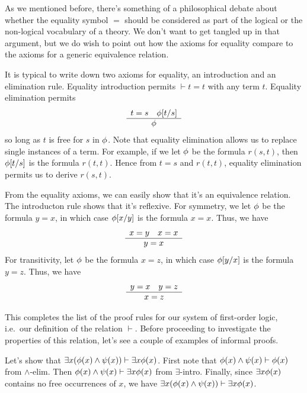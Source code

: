 As we mentioned before, there's something of a philosophical debate
about whether the equality symbol $=$ should be considered as part of
the logical or the non-logical vocabulary of a theory.  We don't want
to get tangled up in that argument, but we do wish to point out how
the axioms for equality compare to the axioms for a generic
equivalence relation.

It is typical to write down two axioms for equality, an introduction
and an elimination rule.  Equality introduction permits $\vdash t=t$
with any term $t$.  Equality elimination permits
\[ \begin{array}{c c} t=s \quad \phi [t/s] \\ \hline \phi
   \end{array} \] so long as $t$ is free for $s$ in $\phi$.  Note that equality elimination allows us to
 replace single instances of a term.  For example, if we let $\phi$
 be the formula $r(s,t)$, then $\phi [t/s]$ is the formula $r(t,t)$.
 Hence from $t=s$ and $r(t,t)$, equality elimination permits us to
 derive $r(s,t)$.

 From the equality axioms, we can easily show that it's an equivalence
 relation.  The introducton rule shows that it's reflexive.  For
 symmetry, we let $\phi$ be the formula $y=x$, in which case
 $\phi [x/y]$ is the formula $x=x$.  Thus, we have
   \[ \begin{array}{c c} x=y\quad x=x \\ \hline y=x \end{array} \]
   For transitivity, let $\phi$ be the formula $x=z$, in which case
   $\phi [y/x]$ is the formula $y=z$.  Thus, we have
   \[ \begin{array}{c c} y=x\quad y=z \\ \hline x=z \end{array} \]

   This completes the list of the proof rules for our system of
   first-order logic, i.e.\ our definition of the relation $\vdash$.
   Before proceeding to investigate the properties of this relation,
   let's see a couple of examples of informal proofs.

   \begin{example} Let's show that
     $\exists x(\phi (x)\wedge \psi (x))\vdash \exists x\phi (x)$.
     First note that $\phi (x)\wedge \psi (x)\vdash \phi (x)$ from
     $\wedge$-elim.  Then
     $\phi (x)\wedge \psi (x)\vdash \exists x\phi (x)$ from
     $\exists$-intro.  Finally, since $\exists x\phi (x)$ contains no
     free occurrences of $x$, we have
     $\exists x(\phi (x)\wedge \psi (x))\vdash \exists x\phi
     (x)$.  \end{example}

